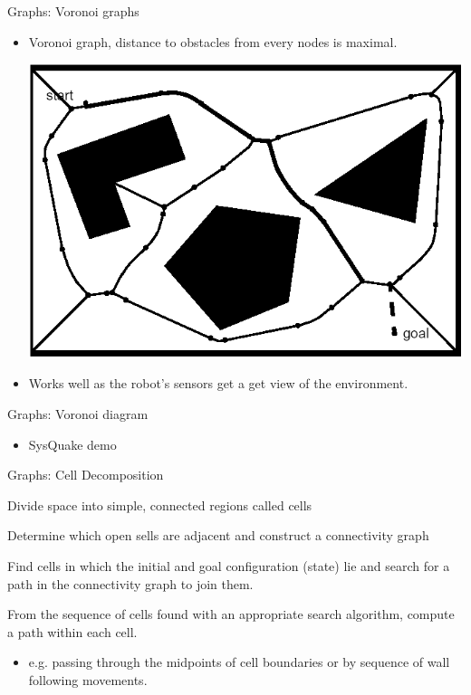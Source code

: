 \documentclass[compress]{beamer}
\begin{document}
\begin{frame}{Graphs: Voronoi graphs}

\begin{itemize}
\item Voronoi graph, distance to obstacles from every nodes is maximal.

    \begin{center}
        \includegraphics[width=0.8\linewidth]{voronoi}
    \end{center}

\item Works well as the robot's sensors get a get view of the environment.
\end{itemize}

\end{frame}

\begin{frame}{Graphs: Voronoi diagram}

\begin{itemize}
\item SysQuake demo
\end{itemize}

\end{frame}

\begin{frame}{Graphs: Cell Decomposition}

Divide space into simple, connected regions called cells

Determine which open sells are adjacent and construct a connectivity
graph

Find cells in which the initial and goal configuration (state) lie and
search for a path in the connectivity graph to join them.

From the sequence of cells found with an appropriate search algorithm,
compute a path within each cell.

\begin{itemize}
\item e.g. passing through the midpoints of cell boundaries or by sequence
  of wall following movements.
\end{itemize}

\end{frame}
\end{document}
